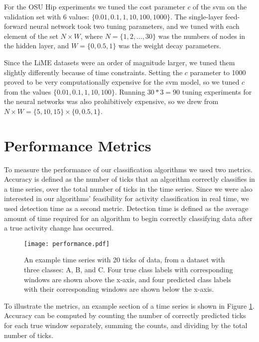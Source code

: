 For the OSU Hip experiments we tuned the
cost parameter $c$ of the svm on the validation set with 6 values:
$\{0.01,0.1,1,10,100,1000\}$. The single-layer feed-forward neural network took
two tuning parameters, and we tuned with each element of the set $N \times W$,
where $N = \{1,2, \ldots, 30\}$ was the numbers of nodes in the hidden layer, and 
$W = \{0,0.5,1\}$ was the weight decay parameters.

Since the LiME datasets were an order of magnitude larger, we tuned them
slightly differently because of time constraints. Setting the $c$ parameter to
1000 proved to be very computationally expensive for the svm model, so we tuned $c$
from the values $\{0.01,0.1,1,10,100\}$. Running $30*3=90$ tuning experiments
for the neural networks was also prohibitively expensive, so we drew from
$N \times W = \{5,10,15\} \times \{0,0.5,1\}$.




\section{Performance Metrics}
To measure the performance of our classification algorithms we used
two metrics. Accuracy is defined as the number of ticks that an algorithm
correctly classifies in a time series, over the total number of ticks
in the time series. Since we were also interested in our algorithms'
feasibility for activity classification in real time, we used detection time as
a second metric. Detection time is defined as the average amount of time
required for an algorithm to begin correctly classifying data after a
true activity change has occurred.

\begin{figure}[H]
 \centering
 \texttt{[image: performance.pdf]}
 \caption{An example time series with 20 ticks of data, from a dataset with
  three classes: A, B, and C. Four true class labels with
  corresponding windows are shown above the x-axis, and four predicted class
  labels with their corresponding windows are shown below the x-axis.}
 \label{fig:performance}
\end{figure}

To illustrate the metrics, an example section of a time series is shown in
Figure \ref{fig:performance}. Accuracy can be computed by counting the number of
correctly predicted ticks for each true window separately, summing the counts,
and dividing by the total number of ticks.

